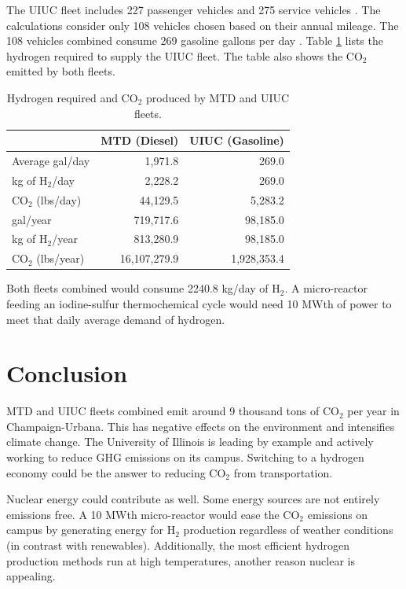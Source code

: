 \documentclass{anstrans}
\begin{document}
The UIUC fleet includes 227 passenger vehicles and 275 service vehicles \cite{noauthor_increase_2020}. The calculations consider only 108 vehicles chosen based on their annual mileage. The 108 vehicles combined consume 269 gasoline gallons per day \cite{holcomb_fueling_2015}. Table \ref{tab:h2req} lists the hydrogen required to supply the UIUC fleet. The table also shows the CO$_2$ emitted by both fleets.

\begin{table}[]
	\centering
    \caption{Hydrogen required and CO$_2$ produced by MTD and UIUC fleets.}
    \label{tab:h2req}
\begin{tabular}{l|rr}
\hline
                   & MTD (Diesel)   & UIUC (Gasoline)  \\ \hline
Average gal/day    & 1,971.8        & 269.0            \\
kg of H$_2$/day    & 2,228.2        & 269.0            \\
CO$_2$ (lbs/day)   & 44,129.5       & 5,283.2          \\
gal/year           & 719,717.6      & 98,185.0         \\
kg of H$_2$/year   & 813,280.9      & 98,185.0         \\
CO$_2$ (lbs/year)  & 16,107,279.9   & 1,928,353.4      \\ \hline
\end{tabular}
\end{table}

Both fleets combined would consume 2240.8 kg/day of H$_2$. A micro-reactor feeding an iodine-sulfur thermochemical cycle would need 10 MWth of power to meet that daily average demand of hydrogen.

\section{Conclusion}

MTD and UIUC fleets combined emit around 9 thousand tons of CO$_2$ per year in Champaign-Urbana. This has negative effects on the environment and intensifies climate change. The University of Illinois is leading by example and actively working to reduce GHG emissions on its campus. Switching to a hydrogen economy could be the answer to reducing CO$_2$ from transportation.

Nuclear energy could contribute as well. Some energy sources are not entirely emissions free. A 10 MWth micro-reactor would ease the CO$_2$ emissions on campus by generating energy for H$_2$ production regardless of weather conditions (in contrast with renewables). Additionally, the most efficient hydrogen production methods run at high temperatures, another reason nuclear is appealing.
\end{document}
